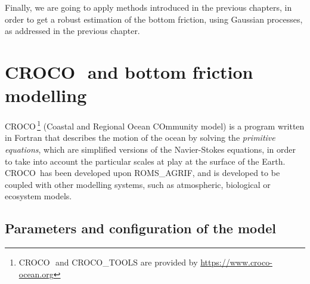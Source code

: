 \documentclass[../../Main_ManuscritThese.tex]{subfiles}
\newcommand{\CROCO}{CROCO\,}
\begin{document}
Finally, we are going to apply methods introduced in the previous
chapters, in order to get a robust estimation of the bottom friction,
using Gaussian processes, as addressed in the previous chapter.



\section{\CROCO\ and bottom friction modelling}
\label{sec:croco_bottom_fr}
\CROCO{}\footnote{\CROCO\ and CROCO\_TOOLS are provided by
  \url{https://www.croco-ocean.org}} (Coastal and Regional Ocean
COmmunity model) is a program written in Fortran that describes the
motion of the ocean by solving the \emph{primitive equations}, which
are simplified versions of the Navier-Stokes equations, in order to
take into account the particular scales at play at the surface of the
Earth. \CROCO{} has been developed upon ROMS\_AGRIF, and is developed
to be coupled with other modelling systems, such as atmospheric,
biological or ecosystem models.



\subsection{Parameters and configuration of the model}
\label{sec:geographical_setting}
\end{document}
